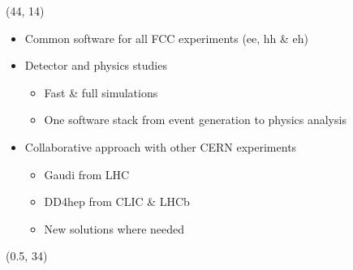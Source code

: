 \documentclass[final,xcolor={dvipsnames,svgnames,x11names,table}]{beamer}
\begin{document}
\begin{frame}
\begin{textblock}{43}
\begin{tcolorbox}[title=The Future Circular Collider Experiment (FCC)]
  \end{tcolorbox}
\end{textblock}

\begin{textblock}{39.5}(44, 14)
  \begin{tcolorbox}[title=FCCSW: Physics and Detector simulations with FCCSW]

  \begin{itemize}
    \item Common software for all FCC experiments (ee, hh \& eh)
    \item Detector and physics studies
      \begin{itemize}
        \item Fast \& full simulations
        \item One software stack from event generation to physics analysis
      \end{itemize}
    \item Collaborative approach with other CERN experiments
      \begin{itemize}
        \item Gaudi from LHC
        \item DD4hep from CLIC \& LHCb
        \item New solutions where needed
      \end{itemize}

  \end{itemize}



  \vspace{1cm}

  \centering
     \vspace{0.5cm}
  \end{tcolorbox}
\end{textblock}

\begin{textblock}{43}(0.5, 34)
  \begin{tcolorbox}[title=The IDEA detector concept for FCC-ee]


\end{tcolorbox}
\end{textblock}
\end{frame}
\end{document}
